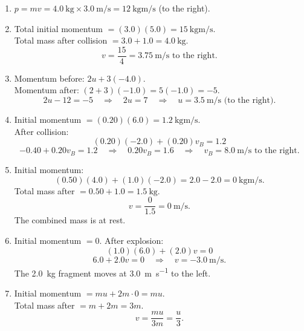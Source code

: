 \documentclass[11pt,a4paper]{article}
\begin{document}
\begin{enumerate}
    \item $p = mv = \SI{4.0}{\kilogram} \times \SI{3.0}{\meter\per\second} = \SI{12}{\kilogram\meter\per\second}$ (to the right).

    \item Total initial momentum $= (3.0)(5.0) = \SI{15}{\kilogram\meter\per\second}$. \\
    Total mass after collision $= 3.0 + 1.0 = \SI{4.0}{\kilogram}$. \\
    \[
        v = \frac{15}{4} = \SI{3.75}{\meter\per\second} \text{ to the right.}
    \]

    \item Momentum before: $2u + 3(-4.0)$. \\
    Momentum after: $(2 + 3)(-1.0) = 5(-1.0) = -5$. \\
    \[
        2u - 12 = -5 \quad\Rightarrow\quad 2u = 7 \quad\Rightarrow\quad u = \SI{3.5}{\meter\per\second} \text{ (to the right).}
    \]

    \item Initial momentum $= (0.20)(6.0) = \SI{1.2}{\kilogram\meter\per\second}$. \\
    After collision:
    \[
        (0.20)(-2.0) + (0.20)v_B = 1.2
    \]
    \[
        -0.40 + 0.20 v_B = 1.2 \quad\Rightarrow\quad 0.20 v_B = 1.6 \quad\Rightarrow\quad v_B = \SI{8.0}{\meter\per\second} \text{ to the right.}
    \]

    \item Initial momentum:
    \[
        (0.50)(4.0) + (1.0)(-2.0) = 2.0 - 2.0 = \SI{0}{\kilogram\meter\per\second}.
    \]
    Total mass after $= 0.50 + 1.0 = \SI{1.5}{\kilogram}$. \\
    \[
        v = \frac{0}{1.5} = \SI{0}{\meter\per\second}.
    \]
    The combined mass is at rest.

    \item Initial momentum $= 0$. After explosion:
    \[
        (1.0)(6.0) + (2.0)v = 0
    \]
    \[
        6.0 + 2.0 v = 0 \quad\Rightarrow\quad v = \SI{-3.0}{\meter\per\second}.
    \]
    The \SI{2.0}{\kilogram} fragment moves at \SI{3.0}{\meter\per\second} to the left.

    \item Initial momentum $= mu + 2m \cdot 0 = mu$. \\
    Total mass after $= m + 2m = 3m$. \\
    \[
        v = \frac{mu}{3m} = \frac{u}{3}.
    \]


\end{enumerate}
\end{document}
